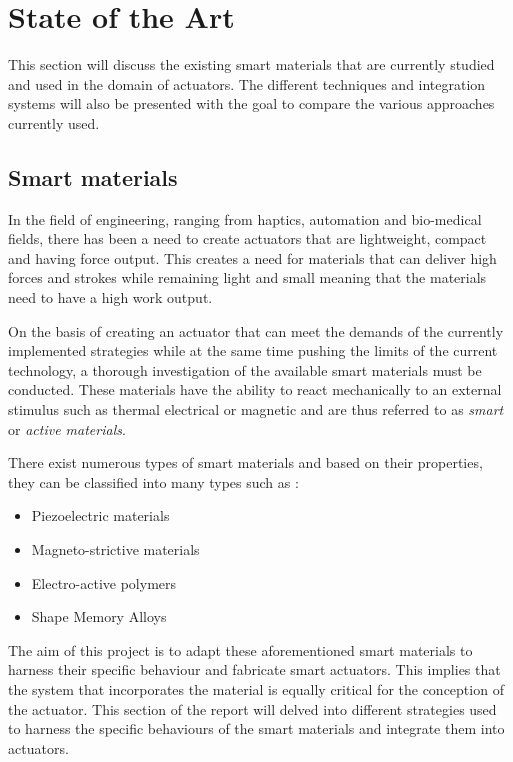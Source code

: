 \section{State of the Art} \label{sec:sota}
This section will discuss the existing smart materials that are currently studied and used in the domain of actuators. The different techniques and integration systems will also be presented with the goal to compare the various approaches currently used.

\subsection{Smart materials} \label{subsec:Smartmaterials}
In the field of engineering, ranging from haptics, automation and bio-medical fields, there has been a need  to create actuators that are lightweight, compact and having force output. This creates a need for materials that can deliver high forces and strokes while remaining light and small meaning that the materials need to have a high work output.

On the basis of creating an actuator that can meet the demands of the currently implemented strategies while at the same time pushing the limits of the current technology, a thorough investigation of the available smart materials must be conducted. These materials have the ability to react mechanically to an external stimulus such as thermal electrical or magnetic and are thus referred to as \emph{smart} or \emph{active materials}.

There exist numerous types of smart materials and based on their properties, they can be classified into many types such as \cite{damodharan_review_2018}:
\begin{itemize}
	\item Piezoelectric materials
	\item Magneto-strictive materials
	\item Electro-active polymers
	\item Shape Memory Alloys
\end{itemize}

The aim of this project is to adapt these aforementioned smart materials to harness their specific behaviour and fabricate smart actuators. This implies that the system that incorporates the material is equally critical for the conception of the actuator. This section of the report will delved into different strategies used to harness the specific behaviours of the smart materials and integrate them into actuators.

